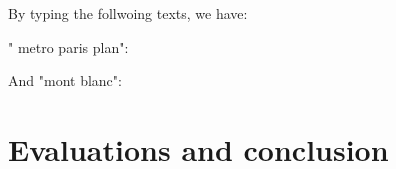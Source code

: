 \documentclass[12pt]{report}	%
\begin{document}
By typing the follwoing texts, we have: 

" metro paris plan": 
\begin{figure}[H]
\centering
{}
\label{fig:inria-dataset}
\end{figure} 

And "mont blanc":

\begin{figure}[H]
\centering
{}
\label{fig:inria-dataset}
\end{figure} 


\section{Evaluations and conclusion}
 

\footnotesize

\normalsize
\end{document}
